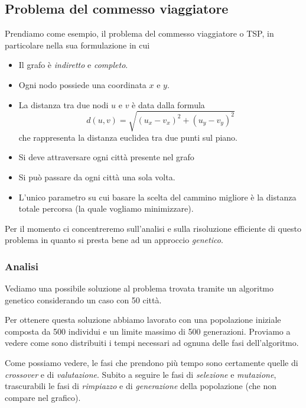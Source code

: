 \subsection{Problema del commesso viaggiatore}

Prendiamo come esempio, il problema del commesso viaggiatore o TSP, in
particolare nella sua formulazione in cui
\begin{itemize}
	\item Il grafo è \emph{indiretto} e \emph{completo}.
	\item Ogni nodo possiede una coordinata $x$ e $y$.
	\item La distanza tra due nodi $u$ e $v$ è data dalla formula
	      \[ d(u, v) = \sqrt{(u_x - v_x)^2 + (u_y - v_y)^2} \]
	      che rappresenta la distanza euclidea tra due punti sul piano.
	\item Si deve attraversare ogni città presente nel grafo
	\item Si può passare da ogni città una sola volta.
	\item L'unico parametro su cui basare la scelta del cammino migliore è
	      la distanza totale percorsa (la quale vogliamo minimizzare).
\end{itemize}
Per il momento ci concentreremo sull'analisi e sulla risoluzione efficiente di
questo problema in quanto si presta bene ad un approccio \emph{genetico}.

\subsubsection{Analisi}

Vediamo una possibile soluzione al problema trovata tramite un algoritmo
genetico considerando un caso con 50 città.
\begin{center}
	
\end{center}
Per ottenere questa soluzione abbiamo lavorato con una popolazione iniziale
composta da 500 individui e un limite massimo di 500 generazioni. Proviamo a
vedere come sono distribuiti i tempi necessari ad ognuna delle fasi
dell'algoritmo.
\begin{center}
	
\end{center}
Come possiamo vedere, le fasi che prendono più tempo sono certamente quelle di
\emph{crossover} e di \emph{valutazione}. Subito a seguire le fasi di
\emph{selezione} e \emph{mutazione}, trascurabili le fasi di \emph{rimpiazzo} e
di \emph{generazione} della popolazione (che non compare nel grafico).

